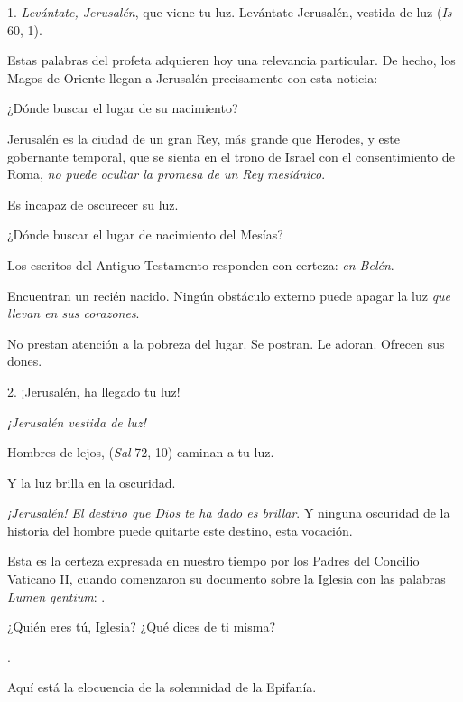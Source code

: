 				\begin{body}
					1. \emph{Levántate, Jerusalén}, que viene tu luz. Levántate Jerusalén, vestida de luz (\emph{Is} 60, 1).
					
					Estas palabras del profeta adquieren hoy una relevancia particular. De hecho, los Magos de Oriente llegan a Jerusalén precisamente con esta noticia: 
					
					¿Dónde buscar el lugar de su nacimiento?
					
					Jerusalén es la ciudad de un gran Rey, más grande que Herodes, y este gobernante temporal, que se sienta en el trono de Israel con el consentimiento de Roma, \emph{no puede ocultar la promesa de un Rey mesiánico}.
					
					Es incapaz de oscurecer su luz.
					
					¿Dónde buscar el lugar de nacimiento del Mesías?
					
					Los escritos del Antiguo Testamento responden con certeza: \emph{en Belén}.
					
					Encuentran un recién nacido. Ningún obstáculo externo puede apagar la luz \emph{que llevan en sus corazones}.
					
					No prestan atención a la pobreza del lugar. Se postran. Le adoran. Ofrecen sus dones.
					
					2. ¡Jerusalén, ha llegado tu luz!
					
					\emph{¡Jerusalén vestida de luz!}
					
					Hombres de lejos,  (\emph{Sal} 72, 10) caminan a tu luz.
					
					Y la luz brilla en la oscuridad.
					
					\emph{¡Jerusalén! El destino que Dios te ha dado es brillar}. Y ninguna oscuridad de la historia del hombre puede quitarte este destino, esta vocación.
					
					Esta es la certeza expresada en nuestro tiempo por los Padres del Concilio Vaticano II, cuando comenzaron su documento sobre la Iglesia con las palabras \emph{Lumen gentium}: .
					
					¿Quién eres tú, Iglesia? ¿Qué dices de ti misma?
					
					.
					
					Aquí está la elocuencia de la solemnidad de la Epifanía.
					

\end{body}
